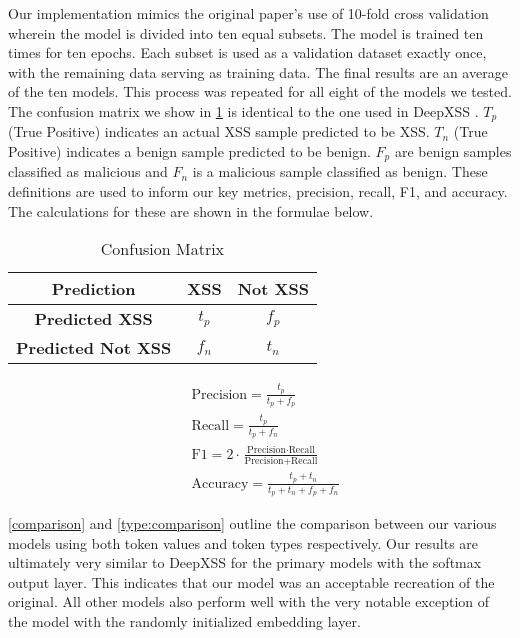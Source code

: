 \begin{table}
\begin{center}
\begingroup
\setlength{\tabcolsep}{10pt} %
\renewcommand{\arraystretch}{1.5} %

Our implementation mimics the original paper’s use of 10-fold cross validation wherein the model is divided into ten equal subsets.  The model is trained ten times for ten epochs.  Each subset is used as a validation dataset exactly once, with the remaining data serving as training data.  The final results are an average of the ten models.  This process was repeated for all eight of the models we tested.
The confusion matrix we show in \ref{conf-mat} is identical to the one used in DeepXSS \cite{fang2018deepxss}. $T_p$ (True Positive) indicates an actual XSS sample predicted to be XSS. $T_n$ (True Positive) indicates a benign sample predicted to be benign. $F_p$ are benign samples classified as malicious and $F_n$ is a malicious sample classified as benign.  These definitions are used to inform our key metrics, precision, recall, F1, and accuracy.  The calculations for these are shown in the formulae below.

\begin{tabular}{|| c | c | c ||} 
    \hline
    Prediction & XSS & Not XSS \\ 
    \hline\hline
    \textbf{Predicted XSS} &  $t_p$ & $f_p$ \\ 
    \hline
    \textbf{Predicted Not XSS} & $f_n$ & $t_n$ \\
    \hline
\end{tabular}
\endgroup
\caption{\label{conf-mat}Confusion Matrix}
\end{center}
\end{table}


\begin{align*}
    &\text{Precision} = \frac{t_p}{t_p + f_p} \\[10pt]
    &\text{Recall} = \frac{t_p}{t_p + f_n} \\[10pt]
    &\text{F1} = 2 \cdot \frac{\text{Precision} \cdot \text{Recall}}{\text{Precision} + \text{Recall}}\\[10pt]
    &\text{Accuracy} = \frac{t_p + t_n}{t_p + t_n + f_p + f_n}
\end{align*}

\ref{comparison} and \ref{type:comparison} outline the comparison between our various models using both token values and token types respectively.  Our results are ultimately very similar to DeepXSS \cite{fang2018deepxss} for the primary models with the softmax output layer.  This indicates that our model was an acceptable recreation of the original. All other models also perform well with the very notable exception of the model with the randomly initialized embedding layer.

